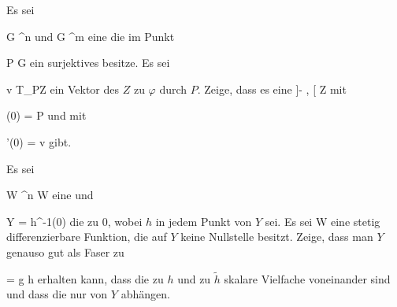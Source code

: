\setcounter{section}{1}


{}
{

Es sei

\mavergleichskette
{\vergleichskette
{ G
}
{ \subseteq }{ \R^n
}
{  }{
}
{    }{
}
{   }{
}
}
{}{}{}
und
\maabbdisp {\varphi} { G } { \R^m
} {}
eine
die im Punkt

\mavergleichskette
{\vergleichskette
{ P
}
{ \in }{ G
}
{  }{
}
{    }{
}
{   }{
}
}
{}{}{}
ein surjektives
besitze. Es sei

\mavergleichskette
{\vergleichskette
{ v
}
{ \in }{ T_PZ
}
{  }{
}
{    }{
}
{   }{
}
}
{}{}{}
ein Vektor des
$Z$ zu $\varphi$ durch $P$. Zeige, dass es eine
\maabbdisp {\gamma} { ]- \epsilon, \epsilon[ } { Z
} {}
 {} {}
mit

\mavergleichskette
{\vergleichskette
{ \gamma(0)
}
{ = }{ P
}
{  }{
}
{    }{
}
{   }{
}
}
{}{}{}
und mit

\mavergleichskettedisp
{\vergleichskette
{ \gamma'(0)
}
{ =} { v
}
{ } {
}
{ } {
}
{ } {
}
}
{}{}{}
gibt.

}
{} {}

{}
{

Es sei

\mavergleichskette
{\vergleichskette
{ W
}
{ \subseteq }{ \R^n
}
{  }{
}
{    }{
}
{   }{
}
}
{}{}{}
 { W } { \R
} {}
eine
und

\mavergleichskette
{\vergleichskette
{ Y
}
{ = }{ h^{-1}(0)
}
{  }{
}
{    }{
}
{   }{
}
}
{}{}{}
die
zu $0$, wobei $h$ in jedem Punkt von $Y$
sei. Es sei
 { W } {\R
} {}
eine stetig differenzierbare Funktion, die auf $Y$ keine Nullstelle besitzt. Zeige, dass man $Y$ genauso gut als Faser zu

\mavergleichskettedisp
{\vergleichskette
{ 
}
{ =} { g h
}
{ } {
}
{ } {
}
{ } {
}
}
{}{}{}
erhalten kann, dass die
zu $h$ und zu $\tilde{h}$  skalare Vielfache voneinander sind und dass die
nur von $Y$ abhängen.

}
{} {}

